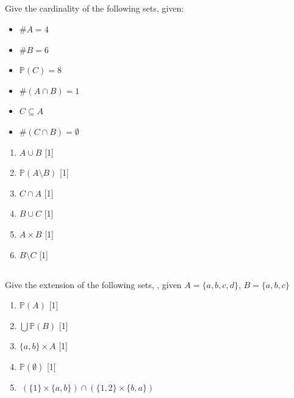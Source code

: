 \documentclass[twocolumn]{article}
\newcounter{pmarks}
\newcounter{marks}
\newcommand\mrk[1]{{\hfill\color{blue}\small[{#1}]}\addtocounter{pmarks}{#1}\addtocounter{marks}{#1}}
\begin{document}
\subsection{}

    Give the cardinality of the following sets, given:

\begin{multicols}{2}
    \begin{itemize}
        \item $\#A = 4$
        \item $\#B = 6$
        \item $\mathbb{P}(C) = 8$
        \item $\#(A \cap B) = 1$
        \item $ C \subseteq A $
        \item $ \# (C \cap B) = \emptyset$
    \end{itemize}
\end{multicols}
\begin{multicols}{2}
    \begin{enumerate}
        \item $ A \cup B $ \mrk{1}
        \item $ \mathbb{P}(A \setminus B)$ \mrk{1}
        \item $ C \cap A $ \mrk{1}
        \item $ B \cup C $ \mrk{1}
        \item $ A \times B $ \mrk{1}
        \item $ B \setminus C$ \mrk{1}
    \end{enumerate}
\end{multicols}

    \subsection{}

    Give the extension of the following sets, , given $A = \{a, b, c, d \}$, $B = \{a, b, c\}$

    \begin{multicols}{2}
        \begin{enumerate}
            \item $\mathbb{P}(A)$ \mrk{1}
            \item $ \bigcup  \mathbb{P}(B)  $ \mrk{1}
            \item $ \{a, b\} \times A $ \mrk{1}
            \item $ \mathbb{P} ( \emptyset ) $ \mrk{1}
        \end{enumerate}
    \end{multicols}
    \begin{enumerate}
        \setcounter{enumi}{4}
        \item $ \ ( \{ 1 \} \times \{ a, b \} ) \cap ( \{ 1, 2 \} \times \{ b, a \} ) $
    \end{enumerate}
\end{document}
